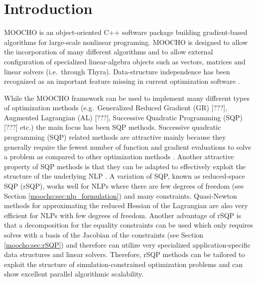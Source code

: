 \documentclass[pdf,ps2pdf,11pt]{SANDreport}
\begin{document}
%
\section{Introduction}
%

MOOCHO is an object-oriented C++ software package building gradient-based
algorithms for large-scale nonlinear programing.  MOOCHO is designed to allow
the incorporation of many different algorithms and to allow external
configuration of specialized linear-algebra objects such as vectors, matrices
and linear solvers (i.e.\ through Thyra).  Data-structure independence has
been recognized as an important feature missing in current optimization
software {}\cite{ref:wright_1999}.

While the MOOCHO framework can be used to implement many different types of
optimization methods (e.g.\ Generalized Reduced Gradient (GR) [???], Augmented
Lagrangian (AL) [???], Successive Quadratic Programming (SQP) [???] etc.) the
main focus has been SQP methods.  Successive quadratic programming (SQP)
related methods are attractive mainly because they generally require the
fewest number of function and gradient evaluations to solve a problem as
compared to other optimization methods {}\cite{ref:schmid_accel_1993}.
Another attractive property of SQP methods is that they can be adapted to
effectively exploit the structure of the underlying NLP
{}\cite{ref:varvarezos_1994}.  A variation of SQP, known as reduced-space SQP
(rSQP), works well for NLPs where there are few degrees of freedom (see
Section {}\ref{moocho:sec:nlp_formulation}) and many constraints.
Quasi-Newton methods for approximating the reduced Hessian of the Lagrangian
are also very efficient for NLPs with few degrees of freedom.  Another
advantage of rSQP is that a decomposition for the equality constraints can be
used which only requires solves with a basis of the Jacobian of the
constraints (see Section {}\ref{moocho:sec:rSQP}) and therefore can utilize
very specialized application-specific data structures and linear solvers.
Therefore, rSQP methods can be tailored to exploit the structure of
simulation-constrained optimization problems and can show excellent parallel
algorithmic scalability.
\end{document}

